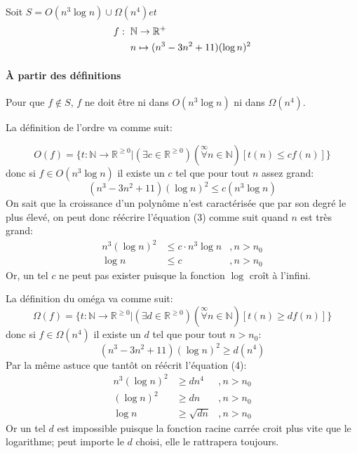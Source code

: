 \documentclass{article}
\begin{document}
\pagebreak

\section{}
Soit $S = O(n^3\log n) \cup \Omega(n^4) et$
$$
\begin{aligned}
  f:\hspace{0.2cm}&\mathbb{N} \rightarrow \mathbb{R}^+\\
  &n \mapsto (n^3 - 3 n^2+11)(\log n)^2
\end{aligned}
$$

\paragraph{À partir des définitions}

Pour que $f \notin S$, $f$ ne doit être ni dans $O(n^3 \log n)$ ni dans $\Omega(n^4)$.

La définition de l'ordre va comme suit:

$$O(f)=\{t:\mathbb{N}\rightarrow\mathbb{R}^{\geq 0} | (\exists c \in \mathbb{R}^{\geq 0})(\stackrel{\infty}{\forall} n \in \mathbb{N})[t(n)\leq cf(n)]\}$$
donc si $f \in O(n^3\log n)$ il existe un $c$ tel que pour tout $n$ assez grand:
\begin{equation}
  (n^3-3n^2+11)(\log n)^2 \leq c (n^3\log n)
\end{equation}
On sait que la croissance d'un polynôme n'est caractérisée que par son degré le plus élevé, on peut donc réécrire l'équation (3) comme suit quand $n$ est très grand:
$$
\begin{aligned}
  n^3(\log n)^2 &\leq c \cdot n^3 \log n&, n > n_0\\
  \log n &\leq c &, n > n_0
\end{aligned}
$$
Or, un tel $c$ ne peut pas exister puisque la fonction $\log$ croît à l'infini.

La définition du oméga va comme suit:
$$\Omega(f)=\{t:\mathbb{N}\rightarrow\mathbb{R}^{\geq 0} | (\exists d \in \mathbb{R}^{\geq 0})(\stackrel{\infty}{\forall} n \in \mathbb{N})[t(n)\geq df(n)]\}$$
donc si $f \in \Omega(n^4)$ il existe un $d$ tel que pour tout $n > n_0$:
\begin{equation}
  (n^3-3n^2+11)(\log n)^2 \geq d (n^4)
\end{equation}
Par la même astuce que tantôt on réécrit l'équation (4):
$$
\begin{aligned}
  n^3(\log n)^2 &\geq d n^4 &, n > n_0\\
  (\log n)^2 &\geq d n &, n > n_0\\
  \log n & \geq \sqrt{d n} &, n > n_0
\end{aligned}
$$
Or un tel $d$ est impossible puisque la fonction racine carrée croit plus vite que le logarithme; peut importe le $d$ choisi, elle le rattrapera toujours.
\end{document}
